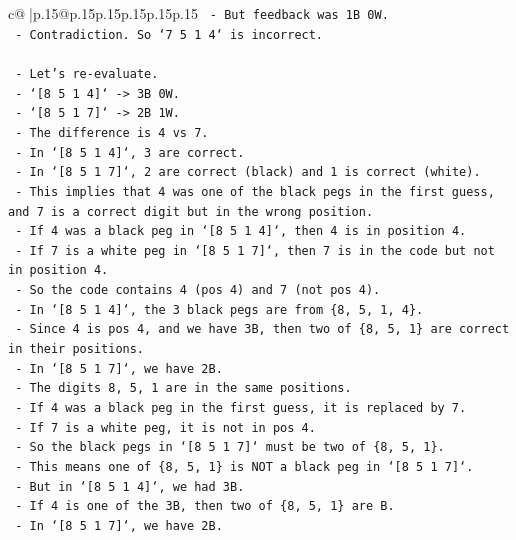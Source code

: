 \documentclass{article}
\begin{document}
{\begin{supertabular}{c@{$\;$}|p{.15\linewidth}@{}p{.15\linewidth}p{.15\linewidth}p{.15\linewidth}p{.15\linewidth}p{.15\linewidth}}
{{{\texttt{        {-} But feedback was 1B 0W.} \\
\texttt{        {-} Contradiction. So `7 5 1 4` is incorrect.} \\
\\ 
\texttt{    {-} Let's re{-}evaluate.} \\
\texttt{    {-} `{[}8 5 1 4{]}` {-}> 3B 0W.} \\
\texttt{    {-} `{[}8 5 1 7{]}` {-}> 2B 1W.} \\
\texttt{    {-} The difference is 4 vs 7.} \\
\texttt{    {-} In `{[}8 5 1 4{]}`, 3 are correct.} \\
\texttt{    {-} In `{[}8 5 1 7{]}`, 2 are correct (black) and 1 is correct (white).} \\
\texttt{    {-} This implies that 4 was one of the black pegs in the first guess, and 7 is a correct digit but in the wrong position.} \\
\texttt{    {-} If 4 was a black peg in `{[}8 5 1 4{]}`, then 4 is in position 4.} \\
\texttt{    {-} If 7 is a white peg in `{[}8 5 1 7{]}`, then 7 is in the code but not in position 4.} \\
\texttt{    {-} So the code contains 4 (pos 4) and 7 (not pos 4).} \\
\texttt{    {-} In `{[}8 5 1 4{]}`, the 3 black pegs are from \{8, 5, 1, 4\}.} \\
\texttt{    {-} Since 4 is pos 4, and we have 3B, then two of \{8, 5, 1\} are correct in their positions.} \\
\texttt{    {-} In `{[}8 5 1 7{]}`, we have 2B.} \\
\texttt{    {-} The digits 8, 5, 1 are in the same positions.} \\
\texttt{    {-} If 4 was a black peg in the first guess, it is replaced by 7.} \\
\texttt{    {-} If 7 is a white peg, it is not in pos 4.} \\
\texttt{    {-} So the black pegs in `{[}8 5 1 7{]}` must be two of \{8, 5, 1\}.} \\
\texttt{    {-} This means one of \{8, 5, 1\} is NOT a black peg in `{[}8 5 1 7{]}`.} \\
\texttt{    {-} But in `{[}8 5 1 4{]}`, we had 3B.} \\
\texttt{    {-} If 4 is one of the 3B, then two of \{8, 5, 1\} are B.} \\
\texttt{    {-} In `{[}8 5 1 7{]}`, we have 2B.} \\
}}}
\end{supertabular}}
\end{document}
